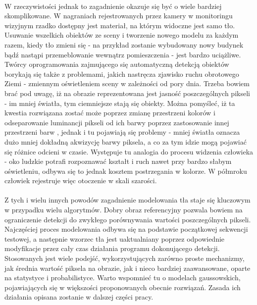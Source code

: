 \paragraph{}
W rzeczywistości jednak to zagadnienie okazuje się być o wiele bardziej skomplikowane. W nagraniach rejestrowanych przez kamery w monitoringu wizyjnym rzadko dostępny jest materiał, na którym widoczne jest samo tło. Usuwanie wszelkich obiektów ze sceny i tworzenie nowego modelu za każdym razem, kiedy tło zmieni się - na przykład zostanie wybudowany nowy budynek bądź nastąpi przemeblowanie wewnątrz pomieszczenia - jest bardzo uciążliwe. Twórcy oprogramowania zajmującego się automatyczną detekcją obiektów borykają się także z problemami, jakich nastręcza zjawisko ruchu obrotowego Ziemi - zmiennym oświetleniem sceny w zależności od pory dnia. Trzeba bowiem brać pod uwagę, iż na obrazie reprezentowana jest jasność poszczególnych pikseli - im mniej światła, tym ciemniejsze stają się obiekty. Można pomyśleć, iż ta kwestia rozwiązana zostać może poprzez zmianę przestrzeni kolorów i odseparowanie luminancji pikseli od ich barwy poprzez zastosowanie innej przestrzeni barw %
, jednak i tu pojawiają się problemy - mniej światła oznacza dużo mniej dokładną akwizycję barwy piksela, a co za tym idzie mogą pojawiać się różnice odcieni w czasie. Występuje tu analogia do procesu widzenia człowieka - oko ludzkie potrafi rozpoznawać kształt i ruch nawet przy bardzo słabym oświetleniu, odbywa się to jednak kosztem postrzegania w kolorze. W półmroku człowiek rejestruje więc otoczenie w skali szarości.
\paragraph{}
Z tych i wielu innych powodów zagadnienie modelowania tła staje się kluczowym w przypadku wielu algorytmów. Dobry obraz referencyjny pozwala bowiem na ograniczenie detekcji do zwykłego porównywania wartości poszczególnych pikseli. Najczęściej proces modelowania odbywa się na podstawie początkowej sekwencji testowej, a następnie wzorzec tła jest uaktualniany poprzez odpowiednie modyfikacje przez cały czas działania programu dokonującego detekcji. Stosowanych jest wiele podejść, wykorzystujących zarówno proste mechanizmy, jak średnia wartość piksela na obrazie, jak i nieco bardziej zaawansowane, oparte na statystyce i probabilistyce. Warto wspomnieć tu o modelach gaussowskich, pojawiających się w większości proponowanych obecnie rozwiązań. Zasada ich działania opisana zostanie w dalszej części pracy.
